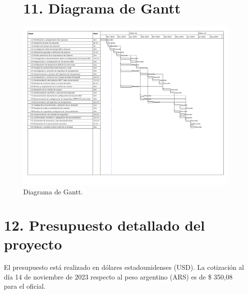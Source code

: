\documentclass[
11pt, %
]{charter}
\begin{document}
\pagebreak

\begin{landscape}
\begin{figure}[htpb]
\section{11. Diagrama de Gantt}
\centering 
\includegraphics[height=\textheight]{./Figuras/Gantt.pdf}
\caption{Diagrama de Gantt.}
\label{fig:diagGantt}
\end{figure}

\end{landscape}

\newpage
\section{12. Presupuesto detallado del proyecto}
\label{sec:presupuesto}

El presupuesto está realizado en dólares estadounidenses (USD). La cotización al día 14 de noviembre de 2023 respecto al peso argentino (ARS) es de {\$ 350,08} para el  oficial.
\end{document}
